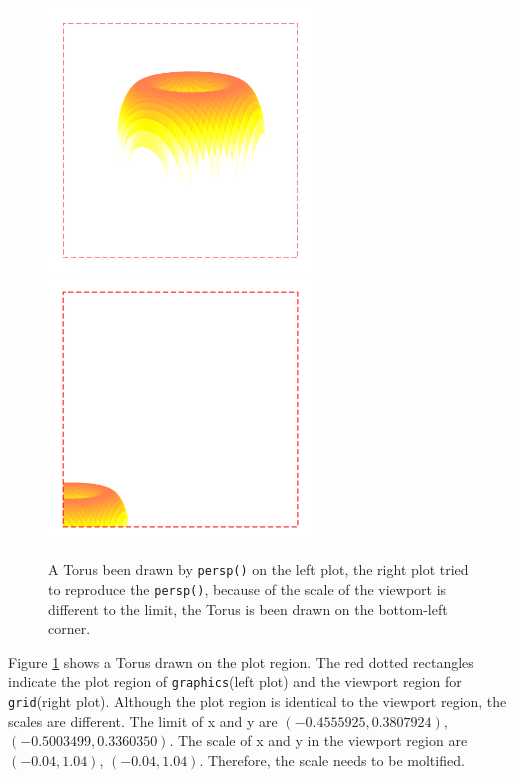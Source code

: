 \documentclass[paper=a4, fontsize=11pt]{report}
\begin{document}
\begin{figure}[h]
	\begin{center}
		\includegraphics[height = 7cm, width = 7cm]{figure/gridGraphics_persp_demo_viewport_1.pdf}
		\includegraphics[height = 7cm, width = 7cm]{figure/gridGraphics_persp_demo_viewport_2.pdf}
		\caption{A Torus been drawn by \texttt{persp()} on the left plot, the right plot tried to reproduce the \texttt{persp()}, because of the scale of the viewport is different to the limit, the Torus is been drawn on the bottom-left corner.}
		\label{figure_4.3}
	\end{center}
\end{figure}

Figure \ref{figure_4.3} shows a Torus drawn on the plot region. The red dotted rectangles indicate the plot region of \texttt{graphics}(left plot) and the viewport region for \texttt{grid}(right plot). Although the plot region is identical to the viewport region, the scales are different. The limit of x and y are $(-0.4555925,  0.3807924)$, $(-0.5003499,  0.3360350)$. The scale of x and y in the viewport region are $(-0.04,  1.04)$, $(-0.04,  1.04)$. Therefore, the scale needs to be moltified. \\
\end{document}
